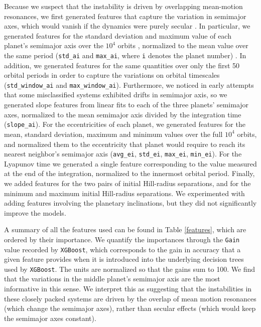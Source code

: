 Because we suspect that the instability is driven by overlapping mean-motion resonances, we first generated features that capture the variation in semimajor axes, which would vanish if the dynamics were purely secular \citep{SSD1999}.  
In particular, we generated features for the standard deviation and maximum value of each planet's semimajor axis over the $10^4$ orbits , normalized to the mean value over the same period  ({\tt std\_ai} and {\tt max\_ai}, where {\tt i} denotes the planet number) .  
In addition, we generated features for the same quantities over only the first 50 orbital periods in order to capture the variations on orbital timescales ({\tt std\_window\_ai} and {\tt max\_window\_ai}).
Furthermore, we noticed in early attempts that some misclassified systems exhibited drifts in semimajor axis, so we generated slope features from linear fits to each of the three planets' semimajor axes, normalized to the mean semimajor axis divided by the integration time ({\tt slope\_ai}).
For the eccentricities of each planet, we generated features for the mean, standard deviation, maximum and minimum values over the full $10^4$ orbits, and normalized them to the eccentricity that planet would require to reach its nearest neighbor's semimajor axis ({\tt avg\_ei}, {\tt std\_ei}, {\tt max\_ei}, {\tt min\_ei}).
For the Lyapunov time we generated a single feature corresponding to the value measured at the end of the integration, normalized to the innermost orbital period.
Finally, we added features for the two pairs of initial Hill-radius separations, and for the minimum and maximum initial Hill-radius separations.
We experimented with adding features involving the planetary inclinations, but they did not significantly improve the models.

A summary of all the features used can be found in Table \ref{features}, which are ordered by their importance.
We quantify the importances through the {\tt Gain} value recorded by {\tt XGBoost}, which corresponds to the gain in accuracy that a given feature provides when it is introduced into the underlying decision trees used by {\tt XGBoost}.  
The units are normalized so that the gains sum to 100.
We find that the variations in the middle planet's semimajor axis are the most informative in this sense.
We interpret this as suggesting that the instabilities in these closely packed systems are driven by the overlap of mean motion resonances (which change the semimajor axes), rather than secular effects (which would keep the semimajor axes constant).

